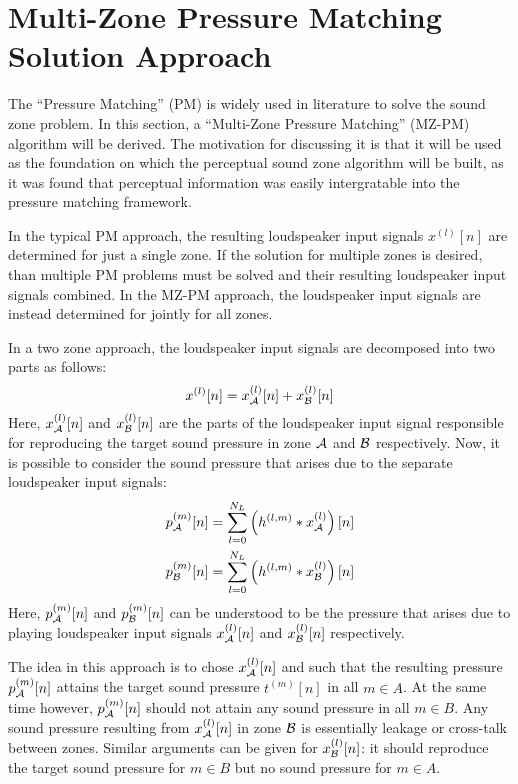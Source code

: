 \section{Multi-Zone Pressure Matching Solution Approach}
\label{sec:pressure_matching}
The ``Pressure Matching'' (PM) is widely used in literature to solve the sound zone problem.
In this section, a ``Multi-Zone Pressure Matching'' (MZ-PM) algorithm will be derived.
The motivation for discussing it is that it will be used as the foundation on which the perceptual sound zone algorithm will be built, 
as it was found that perceptual information was easily intergratable into the pressure matching framework.

In the typical PM approach, the resulting loudspeaker input signals $x^{(l)}[n]$ are determined for just a single zone.
If the solution for multiple zones is desired, than multiple PM problems must be solved and their resulting loudspeaker input signals combined. 
In the MZ-PM approach, the loudspeaker input signals are instead determined for jointly for all zones.

In a two zone approach, the loudspeaker input signals are decomposed into two parts as follows:
\begin{equation}
    x^{(l)}[n] = x_{\mathcal{A}}^{(l)}[n] + x_{\mathcal{B}}^{(l)}[n]
\end{equation}
Here, $x_{\mathcal{A}}^{(l)}[n]$ and $x_{\mathcal{B}}^{(l)}[n]$ are the parts of the loudspeaker input signal responsible for reproducing the target sound pressure 
in zone $\mathcal{A}$ and $\mathcal{B}$ respectively.
Now, it is possible to consider the sound pressure that arises due to the separate loudspeaker input signals:
\begin{align}
    p_{\mathcal{A}}^{(m)}[n] &= \sum_{l=0}^{N_L} \left(h^{(l,m)} \ast x_{\mathcal{A}}^{(l)}\right)[n] \\
    p_{\mathcal{B}}^{(m)}[n] &= \sum_{l=0}^{N_L} \left(h^{(l,m)} \ast x_{\mathcal{B}}^{(l)}\right)[n]
\end{align}
Here, $p_{\mathcal{A}}^{(m)}[n]$ and $p_{\mathcal{B}}^{(m)}[n]$ can be understood to be the pressure that arises due to 
playing loudspeaker input signals $x_{\mathcal{A}}^{(l)}[n]$ and $x_{\mathcal{B}}^{(l)}[n]$ respectively. 

The idea in this approach is to chose $x_{\mathcal{A}}^{(l)}[n]$ and such that the resulting pressure $p_{\mathcal{A}}^{(m)}[n]$ attains the target sound pressure $t^{(m)}[n]$ in all $m \in A$.   
At the same time however, $p_{\mathcal{A}}^{(m)}[n]$ should not attain any sound pressure in all $m \in B$.
Any sound pressure resulting from $x_{\mathcal{A}}^{(l)}[n]$ in zone $\mathcal{B}$ is essentially leakage or cross-talk between zones. 
Similar arguments can be given for $x_{\mathcal{B}}^{(l)}[n]$: it should reproduce the target sound pressure for $m \in B$ but no sound pressure for $m \in A$. 

